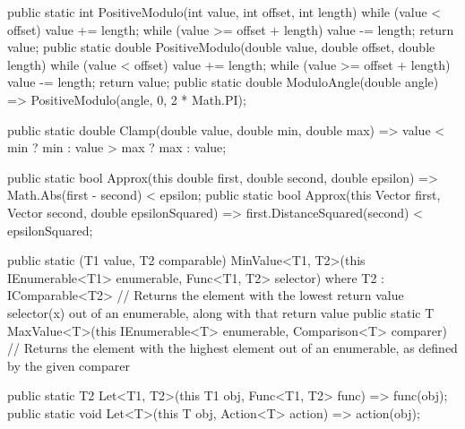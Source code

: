 \documentclass[12pt]{article}
\begin{document}
\begin{Csharp}[caption=class Helper]
public static int PositiveModulo(int value, int offset, int length)
{
    while (value < offset) value += length;
    while (value >= offset + length) value -= length;
    return value;
}
public static double PositiveModulo(double value, double offset, double length)
{
    while (value < offset) value += length;
    while (value >= offset + length) value -= length;
    return value;
}
public static double ModuloAngle(double angle) => PositiveModulo(angle, 0, 2 * Math.PI);

public static double Clamp(double value, double min, double max) => value < min ? min : value > max ? max : value;

public static bool Approx(this double first, double second, double epsilon) => Math.Abs(first - second) < epsilon;
public static bool Approx(this Vector first, Vector second, double epsilonSquared) => first.DistanceSquared(second) < epsilonSquared;

public static (T1 value, T2 comparable) MinValue<T1, T2>(this IEnumerable<T1> enumerable, Func<T1, T2> selector) where T2 : IComparable<T2>
// Returns the element with the lowest return value selector(x) out of an enumerable, along with that return value
public static T MaxValue<T>(this IEnumerable<T> enumerable, Comparison<T> comparer)
// Returns the element with the highest element out of an enumerable, as defined by the given comparer

public static T2 Let<T1, T2>(this T1 obj, Func<T1, T2> func) => func(obj);
public static void Let<T>(this T obj, Action<T> action) => action(obj);
\end{Csharp}
\end{document}
